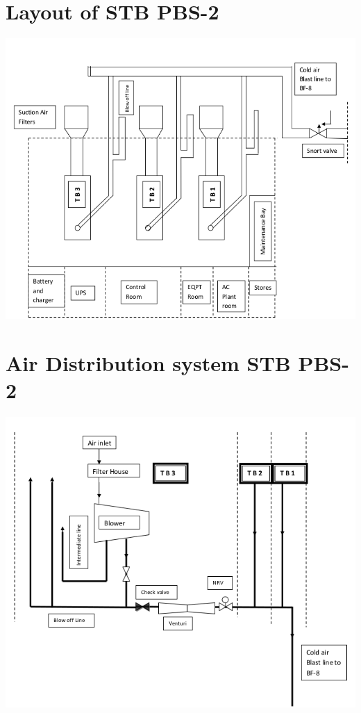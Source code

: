 \documentclass[english,11pt]{report}
\begin{document}
\section{Layout of STB PBS-2}
\includegraphics[width =6in]{layoutstb}
\section{Air Distribution system STB PBS-2}
\includegraphics[width =6in]{airstb}
\end{document}
